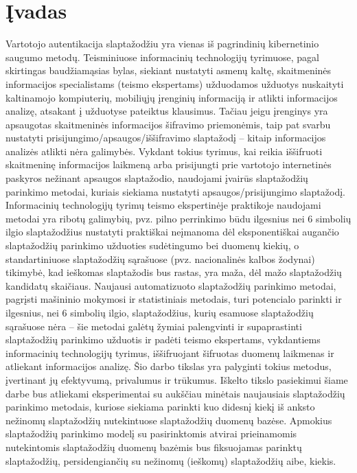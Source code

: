 \documentclass{VUMIFInfBakalaurinis}
\begin{document}
\section{Įvadas}
Vartotojo autentikacija slaptažodžiu yra vienas iš pagrindinių kibernetinio 
saugumo metodų. Teisminiuose informacinių technologijų tyrimuose, pagal 
skirtingas baudžiamąsias bylas, siekiant nustatyti asmenų kaltę, skaitmeninės 
informacijos specialistams (teismo ekspertams) užduodamos užduotys nuskaityti 
kaltinamojo kompiuterių, mobiliųjų įrenginių informaciją ir atlikti informacijos 
analizę, atsakant į užduotyse pateiktus klausimus. Tačiau jeigu įrenginys yra 
apsaugotas skaitmeninės informacijos šifravimo priemonėmis, taip pat svarbu 
nustatyti prisijungimo/apsaugos/iššifravimo slaptažodį -- kitaip informacijos 
analizės atlikti nėra galimybės. Vykdant tokius tyrimus, kai reikia iššifruoti 
skaitmeninę informacijos laikmeną arba prisijungti prie vartotojo internetinės 
paskyros nežinant apsaugos slaptažodio, naudojami įvairūs slaptažodžių parinkimo 
metodai, kuriais siekiama nustatyti apsaugos/prisijungimo slaptažodį. 
Informacinių technologijų tyrimų teismo ekspertinėje praktikoje naudojami 
metodai yra ribotų galimybių, pvz. pilno perrinkimo būdu ilgesnius nei 6 
simbolių ilgio slaptažodžius nustatyti praktiškai neįmanoma dėl eksponentiškai 
augančio slaptažodžių parinkimo užduoties sudėtingumo bei duomenų kiekių, o 
standartiniuose slaptažodžių sąrašuose (pvz. nacionalinės kalbos žodynai) 
tikimybė, kad ieškomas slaptažodis bus rastas, yra maža, dėl mažo slaptažodžių 
kandidatų skaičiaus. Naujausi automatizuoto slaptažodžių parinkimo metodai, 
pagrįsti mašininio mokymosi ir statistiniais metodais, turi potencialo parinkti 
ir ilgesnius, nei 6 simbolių ilgio, slaptažodžius, kurių esamuose slaptažodžių 
sąrašuose nėra -- šie metodai galėtų žymiai palengvinti ir supaprastinti 
slaptažodžių parinkimo užduotis ir padėti teismo ekspertams, vykdantiems 
informacinių technologijų tyrimus, iššifruojant šifruotas duomenų laikmenas ir 
atliekant informacijos analizę. Šio darbo tikslas yra palyginti tokius metodus, 
įvertinant jų efektyvumą, privalumus ir trūkumus. Iškelto tikslo pasiekimui 
šiame darbe bus atliekami eksperimentai su aukščiau minėtais naujausiais 
slaptažodžių parinkimo metodais, kuriose siekiama parinkti kuo didesnį kiekį iš 
anksto nežinomų slaptažodžių nutekintuose slaptažodžių duomenų bazėse. Apmokius 
slaptažodžių parinkimo modelį su pasirinktomis atvirai prieinamomis nutekintomis 
slaptažodžių duomenų bazėmis bus fiksuojamas parinktų slaptažodžių, 
persidengiančių su nežinomų (ieškomų) slaptažodžių aibe, kiekis.
\end{document}
